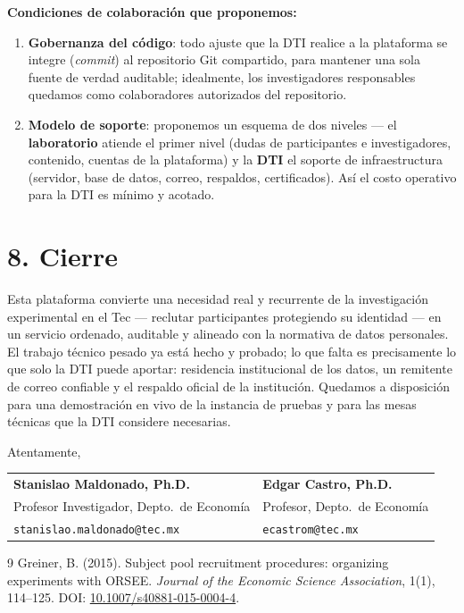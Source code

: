 \documentclass[11pt,letterpaper]{article}
\newcommand{\seccion}[1]{\section*{\color{tecblue}#1}}
\begin{document}
\textbf{Condiciones de colaboración que proponemos:}

\begin{enumerate}[leftmargin=2em]
    \item \textbf{Gobernanza del código}: todo ajuste que la DTI realice a la plataforma se
    integre (\emph{commit}) al repositorio Git compartido, para mantener una sola fuente de
    verdad auditable; idealmente, los investigadores responsables quedamos como
    colaboradores autorizados del repositorio.
    \item \textbf{Modelo de soporte}: proponemos un esquema de dos niveles --- el
    \textbf{laboratorio} atiende el primer nivel (dudas de participantes e investigadores,
    contenido, cuentas de la plataforma) y la \textbf{DTI} el soporte de infraestructura
    (servidor, base de datos, correo, respaldos, certificados). Así el costo operativo para
    la DTI es mínimo y acotado.
\end{enumerate}

\seccion{8. Cierre}

Esta plataforma convierte una necesidad real y recurrente de la investigación experimental
en el Tec --- reclutar participantes protegiendo su identidad --- en un servicio ordenado,
auditable y alineado con la normativa de datos personales. El trabajo técnico pesado ya
está hecho y probado; lo que falta es precisamente lo que solo la DTI puede aportar:
residencia institucional de los datos, un remitente de correo confiable y el respaldo
oficial de la institución. Quedamos a disposición para una demostración en vivo de la
instancia de pruebas y para las mesas técnicas que la DTI considere necesarias.

\vspace{1.5em}
\noindent Atentamente,\\[2.2em]
\noindent
\begin{tabular}{@{}p{}p{}@{}}
\textbf{Stanislao Maldonado, Ph.D.} & \textbf{Edgar Castro, Ph.D.}\\
Profesor Investigador, Depto.\ de Economía & Profesor, Depto.\ de Economía\\
\texttt{stanislao.maldonado@tec.mx} & \texttt{ecastrom@tec.mx}
\end{tabular}

\begin{thebibliography}{9}
Greiner, B. (2015). Subject pool recruitment procedures: organizing experiments with ORSEE.
\emph{Journal of the Economic Science Association}, 1(1), 114--125.
DOI: \href{https://doi.org/10.1007/s40881-015-0004-4}{10.1007/s40881-015-0004-4}.
\end{thebibliography}
\end{document}
